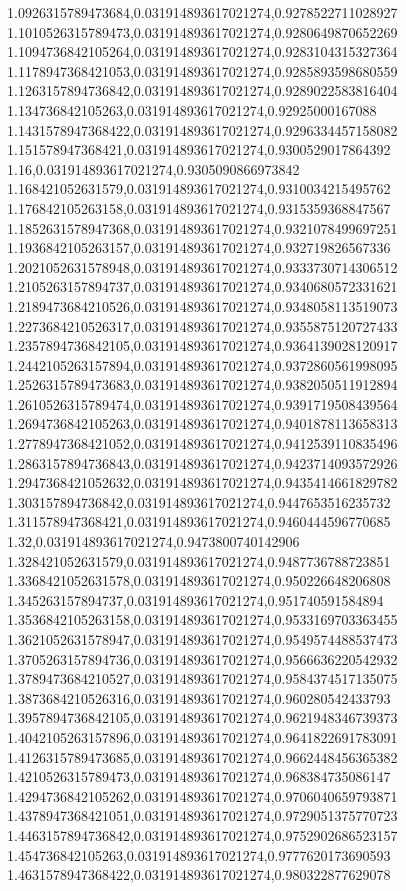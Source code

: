1.0926315789473684,0.031914893617021274,0.9278522711028927
1.1010526315789473,0.031914893617021274,0.9280649870652269
1.1094736842105264,0.031914893617021274,0.9283104315327364
1.1178947368421053,0.031914893617021274,0.9285893598680559
1.1263157894736842,0.031914893617021274,0.9289022583816404
1.134736842105263,0.031914893617021274,0.92925000167088
1.1431578947368422,0.031914893617021274,0.9296334457158082
1.151578947368421,0.031914893617021274,0.9300529017864392
1.16,0.031914893617021274,0.9305090866973842
1.168421052631579,0.031914893617021274,0.9310034215495762
1.176842105263158,0.031914893617021274,0.9315359368847567
1.1852631578947368,0.031914893617021274,0.9321078499697251
1.1936842105263157,0.031914893617021274,0.932719826567336
1.2021052631578948,0.031914893617021274,0.9333730714306512
1.2105263157894737,0.031914893617021274,0.9340680572331621
1.2189473684210526,0.031914893617021274,0.9348058113519073
1.2273684210526317,0.031914893617021274,0.9355875120727433
1.2357894736842105,0.031914893617021274,0.9364139028120917
1.2442105263157894,0.031914893617021274,0.9372860561998095
1.2526315789473683,0.031914893617021274,0.9382050511912894
1.2610526315789474,0.031914893617021274,0.9391719508439564
1.2694736842105263,0.031914893617021274,0.9401878113658313
1.2778947368421052,0.031914893617021274,0.9412539110835496
1.2863157894736843,0.031914893617021274,0.9423714093572926
1.2947368421052632,0.031914893617021274,0.9435414661829782
1.303157894736842,0.031914893617021274,0.9447653516235732
1.311578947368421,0.031914893617021274,0.9460444596770685
1.32,0.031914893617021274,0.9473800740142906
1.328421052631579,0.031914893617021274,0.9487736788723851
1.3368421052631578,0.031914893617021274,0.950226648206808
1.345263157894737,0.031914893617021274,0.951740591584894
1.3536842105263158,0.031914893617021274,0.9533169703363455
1.3621052631578947,0.031914893617021274,0.9549574488537473
1.3705263157894736,0.031914893617021274,0.9566636220542932
1.3789473684210527,0.031914893617021274,0.9584374517135075
1.3873684210526316,0.031914893617021274,0.960280542433793
1.3957894736842105,0.031914893617021274,0.9621948346739373
1.4042105263157896,0.031914893617021274,0.9641822691783091
1.4126315789473685,0.031914893617021274,0.9662448456365382
1.4210526315789473,0.031914893617021274,0.968384735086147
1.4294736842105262,0.031914893617021274,0.9706040659793871
1.4378947368421051,0.031914893617021274,0.9729051375770723
1.4463157894736842,0.031914893617021274,0.9752902686523157
1.454736842105263,0.031914893617021274,0.9777620173690593
1.4631578947368422,0.031914893617021274,0.980322877629078
